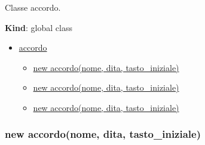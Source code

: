 Classe accordo.

\textbf{Kind}: global class

\begin{itemize}
\tightlist
\item
  \protect\hyperlink{accordo}{accordo}

  \begin{itemize}
  \tightlist
  \item
    \protect\hyperlink{new_accordo_new}{new accordo(nome, dita,
    tasto\_iniziale)}
  \item
    \protect\hyperlink{new_accordo_new}{new accordo(nome, dita,
    tasto\_iniziale)}
  \item
    \protect\hyperlink{new_accordo_new}{new accordo(nome, dita,
    tasto\_iniziale)}
  \end{itemize}
\end{itemize}

\protect\hypertarget{new_accordo_new}{}{}

\hypertarget{new-accordonome-dita-tasto_iniziale-3}{%
\subsubsection{new accordo(nome, dita,
tasto\_iniziale)}\label{new-accordonome-dita-tasto_iniziale-3}}

